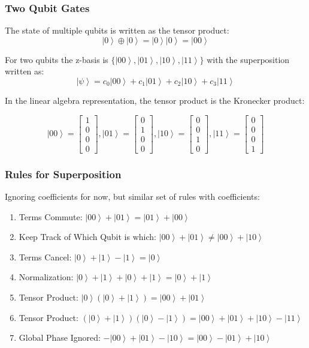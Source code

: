 \documentclass{beamer}
\newcommand{\ket}[1]{\ensuremath{\left|#1\right\rangle}}
\begin{document}
\begin{frame}\frametitle{Two Qubit Gates}
The state of multiple qubits is written as the tensor product:
\[\ket{0} \oplus \ket{0} = \ket{0} \ket{0} = \ket{00}    \]


For two qubits the z-basis is $\{\ket{00}, \ket{01}, \ket{10}, \ket{11} \}$ with the superposition written as:
\[\ket{\psi} = c_0 \ket{00} + c_1 \ket{01} + c_2 \ket{10} + c_3 \ket{11} \]

In the linear algebra representation, the tensor product is the Kronecker product:

\[	\ket{00} = \begin{bmatrix} 1\\0\\0\\0 \end{bmatrix},
	\ket{01} = \begin{bmatrix} 0\\1\\0\\0 \end{bmatrix},
	\ket{10} = \begin{bmatrix} 0\\0\\1\\0 \end{bmatrix},
	\ket{11} = \begin{bmatrix} 0\\0\\0\\1 \end{bmatrix} \]

\end{frame}

\begin{frame}\frametitle{Rules for Superposition}
Ignoring coefficients for now, but similar set of rules with coefficients:
\begin{enumerate}
\item Terms Commute: $\ket{00} + \ket{01} = \ket{01} + \ket{00}$
\item Keep Track of Which Qubit is which: $\ket{00} + \ket{01} \neq \ket{00} + \ket{10}$
\item Terms Cancel: $\ket{0} + \ket{1} - \ket{1} = \ket{0}$
\item Normalization: $\ket{0} + \ket{1} + \ket{0} + \ket{1}= \ket{0} + \ket{1}$
\item Tensor Product: $\ket{0} ( \ket{0} + \ket{1} ) = \ket{00} + \ket{01}$
\item Tensor Product: $(\ket{0} + \ket{1}) ( \ket{0} - \ket{1} ) = \ket{00} + \ket{01} + \ket{10} - \ket{11}$
\item Global Phase Ignored: $-\ket{00} + \ket {01} - \ket{10} = \ket{00} - \ket {01} + \ket{10}$ 
\end{enumerate}

\end{frame}
\end{document}

